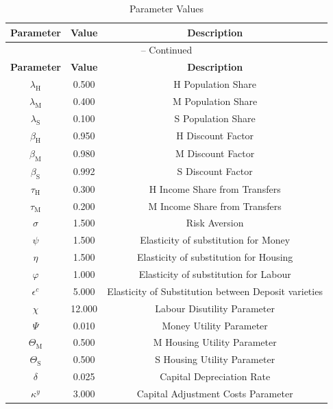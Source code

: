 \begin{center}
\begin{longtable}{ccc}
\caption{Parameter Values}\\%
\toprule%
\multicolumn{1}{c}{\textbf{Parameter}} &
\multicolumn{1}{c}{\textbf{Value}} &
 \multicolumn{1}{c}{\textbf{Description}}\\%
\midrule%
\endfirsthead
\multicolumn{3}{c}{{\tablename} \thetable{} -- Continued}\\%
\midrule%
\multicolumn{1}{c}{\textbf{Parameter}} &
\multicolumn{1}{c}{\textbf{Value}} &
  \multicolumn{1}{c}{\textbf{Description}}\\%
\midrule%
\endhead
$\lambda_\mathrm{H}$ 	 & 	 0.500 	 & 	 H Population Share\\
$\lambda_\mathrm{M}$ 	 & 	 0.400 	 & 	 M Population Share\\
$\lambda_\mathrm{S}$ 	 & 	 0.100 	 & 	 S Population Share\\
$\beta_\mathrm{H}$ 	 & 	 0.950 	 & 	 H Discount Factor\\
$\beta_\mathrm{M}$ 	 & 	 0.980 	 & 	 M Discount Factor\\
$\beta_\mathrm{S}$ 	 & 	 0.992 	 & 	 S Discount Factor\\
$\tau_\mathrm{H}$ 	 & 	 0.300 	 & 	 H Income Share from Transfers\\
$\tau_\mathrm{M}$ 	 & 	 0.200 	 & 	 M Income Share from Transfers\\
$\sigma$ 	 & 	 1.500 	 & 	 Risk Aversion\\
$\psi$ 	 & 	 1.500 	 & 	 Elasticity of substitution for Money\\
$\eta$ 	 & 	 1.500 	 & 	 Elasticity of substitution for Housing\\
$\varphi$ 	 & 	 1.000 	 & 	 Elasticity of substitution for Labour\\
$\epsilon^c$ 	 & 	 5.000 	 & 	 Elasticity of Substitution between Deposit varieties\\
$\chi$ 	 & 	 12.000 	 & 	 Labour Disutility Parameter\\
$\Psi$ 	 & 	 0.010 	 & 	 Money Utility Parameter\\
$\Theta_\mathrm{M}$ 	 & 	 0.500 	 & 	 M Housing Utility Parameter\\
$\Theta_\mathrm{S}$ 	 & 	 0.500 	 & 	 S Housing Utility Parameter\\
$\delta$ 	 & 	 0.025 	 & 	 Capital Depreciation Rate\\
$\kappa^y$ 	 & 	 3.000 	 & 	 Capital Adjustment Costs Parameter\\

\end{longtable}
\end{center}
